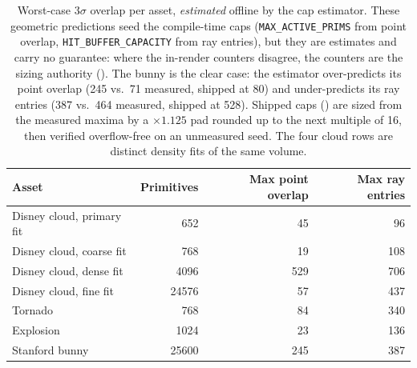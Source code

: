 \begin{table}[htp]
  \centering
  \begin{tabular}{@{}lrrr@{}}
    \toprule
    Asset & Primitives & Max point overlap & Max ray entries \\
    \midrule
    Disney cloud, primary fit & \num{652}   & \num{45}  & \num{96}  \\
    Disney cloud, coarse fit  & \num{768}   & \num{19}  & \num{108} \\
    Disney cloud, dense fit   & \num{4096}  & \num{529} & \num{706} \\
    Disney cloud, fine fit    & \num{24576} & \num{57}  & \num{437} \\
    Tornado                & \num{768}   & \num{84}  & \num{340} \\
    Explosion              & \num{1024}  & \num{23}  & \num{136} \\
    Stanford bunny         & \num{25600} & \num{245} & \num{387} \\
    \bottomrule
  \end{tabular}
  \caption{Worst-case $3\sigma$ overlap per asset, \emph{estimated} offline by the cap estimator. These
  geometric predictions seed the compile-time caps (\texttt{MAX\_ACTIVE\_PRIMS} from point overlap,
  \texttt{HIT\_BUFFER\_CAPACITY} from ray entries), but they are estimates and carry no guarantee: where the
  in-render counters disagree, the counters are the sizing authority (). The bunny is the clear case: the estimator over-predicts its point overlap (\num{245}
vs.\ \num{71} measured, shipped at \num{80}) and under-predicts its ray entries (\num{387}
vs.\ \num{464} measured, shipped at \num{528}). Shipped caps () are sized
from the measured maxima by a $\times1.125$ pad rounded up to the next multiple of
\num{16}, then verified overflow-free on an unmeasured seed. The four cloud rows are
distinct density fits of the same volume.}
  \label{tab:overlap}
\end{table}
